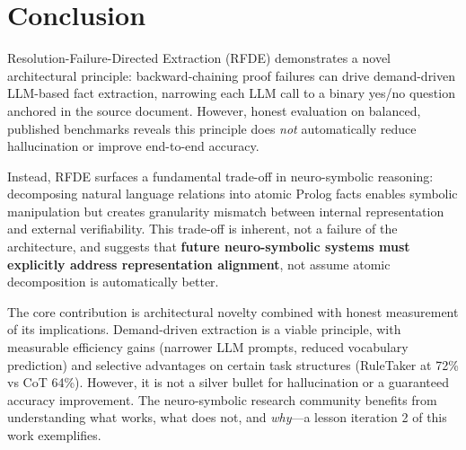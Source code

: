 \documentclass[11pt,letterpaper]{article}
\begin{document}
\section{Conclusion}

Resolution-Failure-Directed Extraction (RFDE) demonstrates a novel architectural principle: backward-chaining proof failures can drive demand-driven LLM-based fact extraction, narrowing each LLM call to a binary yes/no question anchored in the source document. However, honest evaluation on balanced, published benchmarks reveals this principle does \emph{not} automatically reduce hallucination or improve end-to-end accuracy.

Instead, RFDE surfaces a fundamental trade-off in neuro-symbolic reasoning: decomposing natural language relations into atomic Prolog facts enables symbolic manipulation but creates granularity mismatch between internal representation and external verifiability. This trade-off is inherent, not a failure of the architecture, and suggests that \textbf{future neuro-symbolic systems must explicitly address representation alignment}, not assume atomic decomposition is automatically better.

The core contribution is architectural novelty combined with honest measurement of its implications. Demand-driven extraction is a viable principle, with measurable efficiency gains (narrower LLM prompts, reduced vocabulary prediction) and selective advantages on certain task structures (RuleTaker at 72\% vs CoT 64\%). However, it is not a silver bullet for hallucination or a guaranteed accuracy improvement. The neuro-symbolic research community benefits from understanding what works, what does not, and \emph{why}---a lesson iteration 2 of this work exemplifies.



\end{document}
